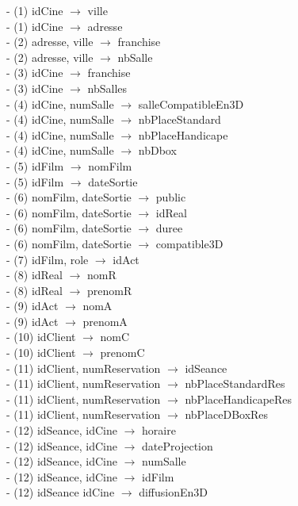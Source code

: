 \documentclass[a4paper,sffamily,12pt]{article}
\begin{document}
					\noindent- (1) idCine $\rightarrow$ ville \\
					- (1) idCine $\rightarrow$ adresse \\
					- (2) adresse, ville $\rightarrow$ franchise \\
					- (2) adresse, ville $\rightarrow$ nbSalle \\
					- (3) idCine $\rightarrow$ franchise \\
					- (3) idCine $\rightarrow$ nbSalles \\
					- (4) idCine, numSalle $\rightarrow$ salleCompatibleEn3D \\
			 		- (4) idCine, numSalle $\rightarrow$ nbPlaceStandard \\
			 		- (4) idCine, numSalle $\rightarrow$ nbPlaceHandicape \\
			 		- (4) idCine, numSalle $\rightarrow$ nbDbox \\
			 		- (5) idFilm $\rightarrow$ nomFilm \\
			 		- (5) idFilm $\rightarrow$ dateSortie \\				 		
					- (6) nomFilm, dateSortie $\rightarrow$ public \\
					- (6) nomFilm, dateSortie $\rightarrow$ idReal \\
					- (6) nomFilm, dateSortie $\rightarrow$ duree \\
					- (6) nomFilm, dateSortie $\rightarrow$ compatible3D \\
					- (7) idFilm, role $\rightarrow$ idAct \\
					- (8) idReal $\rightarrow$ nomR \\
					- (8) idReal $\rightarrow$ prenomR \\						
					- (9) idAct $\rightarrow$ nomA \\
					- (9) idAct $\rightarrow$ prenomA \\						
					- (10) idClient $\rightarrow$ nomC \\
					- (10) idClient $\rightarrow$ prenomC \\						
					- (11) idClient, numReservation $\rightarrow$ idSeance \\
					- (11) idClient, numReservation $\rightarrow$ nbPlaceStandardRes \\
					- (11) idClient, numReservation $\rightarrow$ nbPlaceHandicapeRes \\
					- (11) idClient, numReservation $\rightarrow$ nbPlaceDBoxRes \\
					- (12) idSeance, idCine $\rightarrow$ horaire \\
					- (12) idSeance, idCine $\rightarrow$ dateProjection \\
					- (12) idSeance, idCine $\rightarrow$ numSalle \\
					- (12) idSeance, idCine $\rightarrow$ idFilm \\
					- (12) idSeance  idCine $\rightarrow$ diffusionEn3D \\
			
\end{document}
